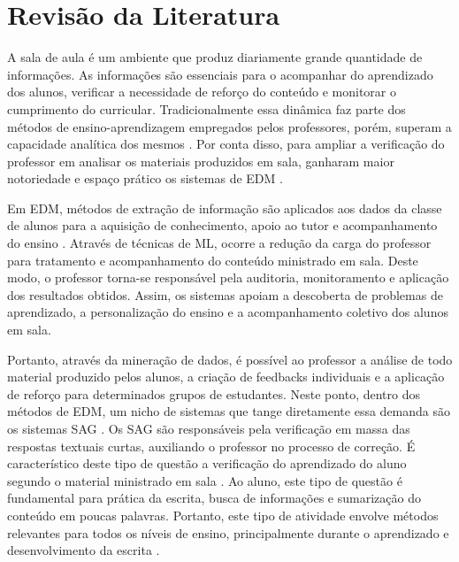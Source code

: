 \chapter{Revisão da Literatura}
\label{cap-literatura}

A sala de aula é um ambiente que produz diariamente grande quantidade de informações. As informações são essenciais para o acompanhar do aprendizado dos alunos, verificar a necessidade de reforço do conteúdo e monitorar o cumprimento do curricular. Tradicionalmente essa dinâmica faz parte dos métodos de ensino-aprendizagem empregados pelos professores, porém, superam a capacidade analítica dos mesmos \cite{madero2019}. Por conta disso, para ampliar a verificação do professor em analisar os materiais produzidos em sala, ganharam maior notoriedade e espaço prático os sistemas de EDM \cite{siemens2012, romero2010}.

Em EDM, métodos de extração de informação são aplicados aos dados da classe de alunos para a aquisição de conhecimento, apoio ao tutor e acompanhamento do ensino \cite{ferreiramello2019}. Através de técnicas de ML, ocorre a redução da carga do professor para tratamento e acompanhamento do conteúdo ministrado em sala. Deste modo, o professor torna-se responsável pela auditoria, monitoramento e aplicação dos resultados obtidos. Assim, os sistemas apoiam a descoberta de problemas de aprendizado, a personalização do ensino e a acompanhamento coletivo dos alunos em sala. 

Portanto, através da mineração de dados, é possível ao professor a análise de todo material produzido pelos alunos, a criação de feedbacks individuais e a aplicação de reforço para determinados grupos de estudantes. Neste ponto, dentro dos métodos de EDM, um nicho de sistemas que tange diretamente essa demanda são os sistemas SAG \cite{burrows2015}. Os SAG são responsáveis pela verificação em massa das respostas textuais curtas, auxiliando o professor no processo de correção. É característico deste tipo de questão a verificação do aprendizado do aluno segundo o material ministrado em sala \cite{oliveira2013}. Ao aluno, este tipo de questão é fundamental para prática da escrita, busca de informações e sumarização do conteúdo em poucas palavras. Portanto, este tipo de atividade envolve métodos relevantes para todos os níveis de ensino, principalmente durante o aprendizado e desenvolvimento da escrita \cite{johnstone2002}.

